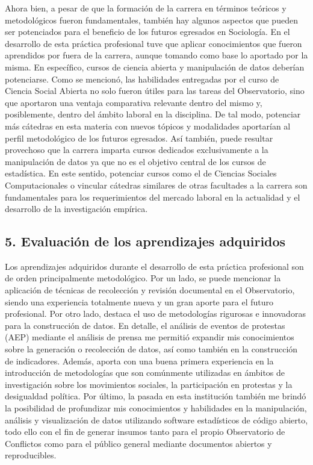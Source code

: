 \documentclass[
  12pt,
]{article}
\begin{document}
Ahora bien, a pesar de que la formación de la carrera en términos
teóricos y metodológicos fueron fundamentales, también hay algunos
aspectos que pueden ser potenciados para el beneficio de los futuros
egresados en Sociología. En el desarrollo de esta práctica profesional
tuve que aplicar conocimientos que fueron aprendidos por fuera de la
carrera, aunque tomando como base lo aportado por la misma. En
específico, cursos de ciencia abierta y manipulación de datos deberían
potenciarse. Como se mencionó, las habilidades entregadas por el curso
de Ciencia Social Abierta no solo fueron útiles para las tareas del
Observatorio, sino que aportaron una ventaja comparativa relevante
dentro del mismo y, posiblemente, dentro del ámbito laboral en la
disciplina. De tal modo, potenciar más cátedras en esta materia con
nuevos tópicos y modalidades aportarían al perfil metodológico de los
futuros egresados. Así también, puede resultar provechoso que la carrera
imparta cursos dedicados exclusivamente a la manipulación de datos ya
que no es el objetivo central de los cursos de estadística. En este
sentido, potenciar cursos como el de Ciencias Sociales Computacionales o
vincular cátedras similares de otras facultades a la carrera son
fundamentales para los requerimientos del mercado laboral en la
actualidad y el desarrollo de la investigación empírica.

\hypertarget{evaluaciuxf3n-de-los-aprendizajes-adquiridos}{%
\subsection{5. Evaluación de los aprendizajes
adquiridos}\label{evaluaciuxf3n-de-los-aprendizajes-adquiridos}}

\doublespacing

Los aprendizajes adquiridos durante el desarrollo de esta práctica
profesional son de orden principalmente metodológico. Por un lado, se
puede mencionar la aplicación de técnicas de recolección y revisión
documental en el Observatorio, siendo una experiencia totalmente nueva y
un gran aporte para el futuro profesional. Por otro lado, destaca el uso
de metodologías rigurosas e innovadoras para la construcción de datos.
En detalle, el análisis de eventos de protestas (AEP) mediante el
análisis de prensa me permitió expandir mis conocimientos sobre la
generación o recolección de datos, así como también en la construcción
de indicadores. Además, aporta con una buena primera experiencia en la
introducción de metodologías que son comúnmente utilizadas en ámbitos de
investigación sobre los movimientos sociales, la participación en
protestas y la desigualdad política. Por último, la pasada en esta
institución también me brindó la posibilidad de profundizar mis
conocimientos y habilidades en la manipulación, análisis y visualización
de datos utilizando software estadísticos de código abierto, todo ello
con el fin de generar insumos tanto para el propio Observatorio de
Conflictos como para el público general mediante documentos abiertos y
reproducibles.
\end{document}
